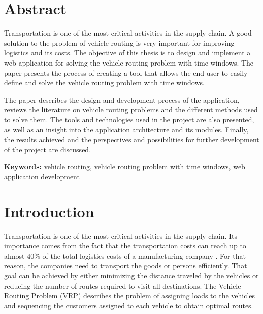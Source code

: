 \documentclass[a4paper,twoside,12pt]{book}
\newcounter{PagesWithoutNumbers}
\begin{document}
\pagestyle{onlyPageNumbers}
\tableofcontents

\setcounter{PagesWithoutNumbers}{\value{page}}
\mainmatter
\pagestyle{empty}

\chapter*{Abstract}

Transportation is one of the most critical activities in the supply chain. A good solution to the problem of vehicle routing is very important for improving logistics and its costs. The objective of this thesis is to design and implement a web application for solving the vehicle routing problem with time windows. The paper presents the process of creating a tool that allows the end user to easily define and solve the vehicle routing problem with time windows.

The paper describes the design and development process of the application, reviews the literature on vehicle routing problems and the different methods used to solve them. The tools and technologies used in the project are also presented, as well as an insight into the application architecture and its modules. Finally, the results achieved and the perspectives and possibilities for further development of the project are discussed.




{\bf Keywords:} vehicle routing, vehicle routing problem with time windows, web application development


\cleardoublepage


\pagestyle{PageNumbersChapterTitles}


\normalfont
\chapter{Introduction}

 Transportation is one of the most critical activities in the supply chain. Its importance comes from the fact that the transportation costs can reach up to almost 40\% of the total logistics costs of a manufacturing company \cite{bib:article:sukiennik}. For that reason, the companies need to transport the goods or persons efficiently. That goal can be achieved by either minimizing the distance traveled by the vehicles or reducing the number of routes required to visit all destinations. The Vehicle Routing Problem (VRP) describes the problem of assigning loads to the vehicles and sequencing the customers assigned to each vehicle to obtain optimal routes.
\end{document}
